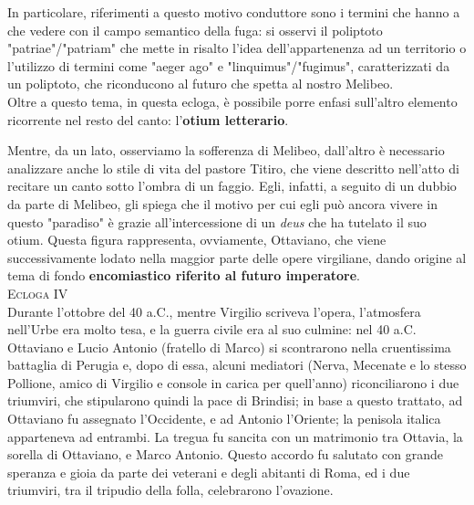 \documentclass[10pt,a4paper]{article}
\begin{document}
	In particolare, riferimenti a questo motivo conduttore sono i termini che hanno a che vedere con il campo semantico della fuga: si osservi il poliptoto "patriae"/"patriam" che mette in risalto l'idea dell'appartenenza ad un territorio o l'utilizzo di termini come "aeger ago" e "linquimus"/"fugimus", caratterizzati da un poliptoto, che riconducono al futuro che spetta al nostro Melibeo.\\
	
	Oltre a questo tema, in questa ecloga, è possibile porre enfasi sull'altro elemento ricorrente nel resto del canto: l'\textbf{otium letterario}. 
	
	Mentre, da un lato, osserviamo la sofferenza di Melibeo, dall'altro è necessario analizzare anche lo stile di vita del pastore Titiro, che viene descritto nell'atto di recitare un canto sotto l'ombra di un faggio. Egli, infatti, a seguito di un dubbio da parte di Melibeo, gli spiega che il motivo per cui egli può ancora vivere in questo "paradiso" è grazie all'intercessione di un \textit{deus} che ha tutelato il suo otium. Questa figura rappresenta, ovviamente, Ottaviano, che viene successivamente lodato nella maggior parte delle opere virgiliane, dando origine al tema di fondo \textbf{encomiastico riferito al futuro imperatore}.\\
	
	\textsc{Ecloga IV}\\
	
	Durante l'ottobre del 40 a.C., mentre Virgilio scriveva l'opera, l'atmosfera nell'Urbe era molto tesa, e la guerra civile era al suo culmine: nel 40 a.C. Ottaviano e Lucio Antonio (fratello di Marco) si scontrarono nella cruentissima battaglia di Perugia e, dopo di essa, alcuni mediatori (Nerva, Mecenate e lo stesso Pollione, amico di Virgilio e console in carica per quell'anno) riconciliarono i due triumviri, che stipularono quindi la pace di Brindisi; in base a questo trattato, ad Ottaviano fu assegnato l'Occidente, e ad Antonio l'Oriente; la penisola italica apparteneva ad entrambi. La tregua fu sancita con un matrimonio tra Ottavia, la sorella di Ottaviano, e Marco Antonio. Questo accordo fu salutato con grande speranza e gioia da parte dei veterani e degli abitanti di Roma, ed i due triumviri, tra il tripudio della folla, celebrarono l'ovazione.
	
\end{document}
